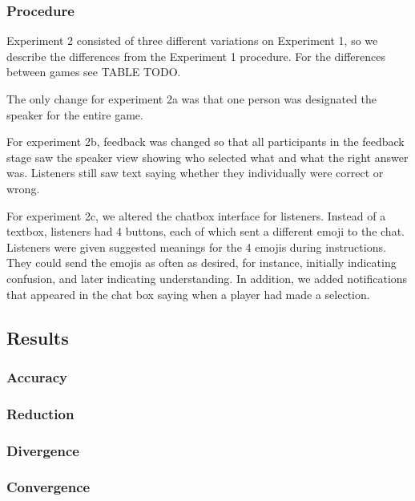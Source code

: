 \documentclass[
  english,
  a4paper,
]{article}
\begin{document}
\hypertarget{procedure-1}{%
\subsubsection{Procedure}\label{procedure-1}}

Experiment 2 consisted of three different variations on Experiment 1, so we describe the differences from the Experiment 1 procedure. For the differences between games see TABLE TODO.

The only change for experiment 2a was that one person was designated the speaker for the entire game.

For experiment 2b, feedback was changed so that all participants in the feedback stage saw the speaker view showing who selected what and what the right answer was. Listeners still saw text saying whether they individually were correct or wrong.

For experiment 2c, we altered the chatbox interface for listeners. Instead of a textbox, listeners had 4 buttons, each of which sent a different emoji to the chat. Listeners were given suggested meanings for the 4 emojis during instructions. They could send the emojis as often as desired, for instance, initially indicating confusion, and later indicating understanding. In addition, we added notifications that appeared in the chat box saying when a player had made a selection.

\hypertarget{results-1}{%
\subsection{Results}\label{results-1}}

\hypertarget{accuracy-1}{%
\subsubsection{Accuracy}\label{accuracy-1}}

\hypertarget{reduction-2}{%
\subsubsection{Reduction}\label{reduction-2}}

\hypertarget{divergence-1}{%
\subsubsection{Divergence}\label{divergence-1}}

\hypertarget{convergence-1}{%
\subsubsection{Convergence}\label{convergence-1}}
\end{document}
